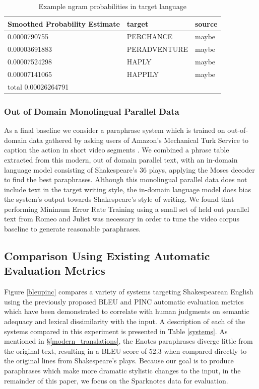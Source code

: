 \documentclass[10pt,a5paper,twoside]{article}
\begin{document}
\begin{table}
  \begin{center}
  \begin{tabular}{|l|l|l|}
    \hline
    Smoothed Probability Estimate & target & source \\
    \hline
    \hline
    0.0000790755 & PERCHANCE & maybe \\
    \hline
    0.00003691883 & PERADVENTURE & maybe \\
    \hline
    0.00007524298 & HAPLY & maybe \\
    \hline
    0.00007141065 & HAPPILY & maybe \\
    \hline
    \hline
    total 0.00026264791 & & \\
    \hline
  \end{tabular}
  \end{center}
  \caption{Example ngram probabilities in target language}
  \label{word_frequency}
\end{table}

\subsubsection{Out of Domain Monolingual Parallel Data}
\label{video_baseline}
As a final baseline we consider a paraphrase system which is trained on out-of-domain data gathered by asking users of Amazon's Mechanical Turk Service 
\cite{Snow08} to caption the action in short video segments \cite{chen11}.  We combined a phrase table extracted from this modern, out of domain parallel text, with an in-domain
language model consisting of Shakespeare's 36 plays, applying the Moses decoder \cite{Koehn07} to find the best paraphrases. 
Although this monolingual parallel data does not include text in the target writing style,
the in-domain language model does bias the system's output towards Shakespeare's style of writing.
We found that performing Minimum Error Rate Training \cite{MERT} using a small set of held out parallel text from Romeo and Juliet was necessary in order to tune the
video corpus baseline to generate reasonable paraphrases.

\subsection{Comparison Using Existing Automatic Evaluation Metrics}
Figure \ref{bleupinc} compares a variety of systems targeting Shakespearean English using the previously proposed BLEU \cite{Papineni02} and PINC \cite{chen11} automatic evaluation metrics which
have been demonstrated to correlate with human judgments on semantic adequacy and lexical dissimilarity with the input.
A description of each of the systems compared in this experiment is presented in Table \ref{systems}.  As mentioned in \S \ref{modern_translations}, the Enotes paraphrases diverge little from the original text,
resulting in a BLEU score of 52.3 when compared directly to the original lines from Shakespeare's plays.  Because our goal is to produce paraphrases which make more dramatic stylistic changes to the input,
in the remainder of this paper, we focus on the Sparknotes data for evaluation.
\end{document}
